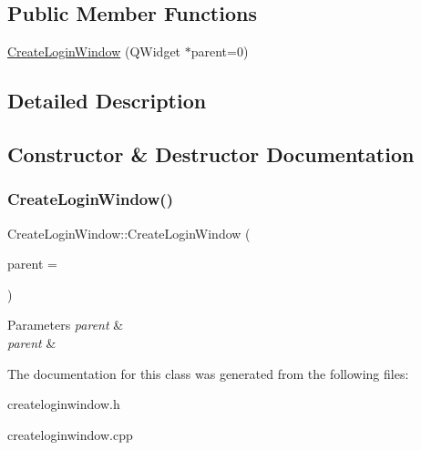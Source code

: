 \subsection*{Public Member Functions}
\begin{DoxyCompactItemize}
\item 
\hyperlink{class_create_login_window_a5bddab7d05cb0e6b22dae4b96cc8ef13}{Create\+Login\+Window} (Q\+Widget $\ast$parent=0)
\end{DoxyCompactItemize}


\subsection{Detailed Description}

\begin{DoxyItemize}
\item 
\end{DoxyItemize}

\subsection{Constructor \& Destructor Documentation}
\mbox{\label{class_create_login_window_a5bddab7d05cb0e6b22dae4b96cc8ef13}} 
\subsubsection{\texorpdfstring{Create\+Login\+Window()}{CreateLoginWindow()}}
{\footnotesize\ttfamily Create\+Login\+Window\+::\+Create\+Login\+Window (\begin{DoxyParamCaption}\item[{Q\+Widget $\ast$}]{parent = {} }\end{DoxyParamCaption})\hspace{0.3cm}{\ttfamily [explicit]}}


\begin{DoxyItemize}
\item 
\begin{DoxyParams}{Parameters}
{\em parent} & \\
\hline
{\em parent} & \\
\hline
\end{DoxyParams}

\end{DoxyItemize}

The documentation for this class was generated from the following files\+:\begin{DoxyCompactItemize}
\item 
createloginwindow.\+h\item 
createloginwindow.\+cpp\end{DoxyCompactItemize}
